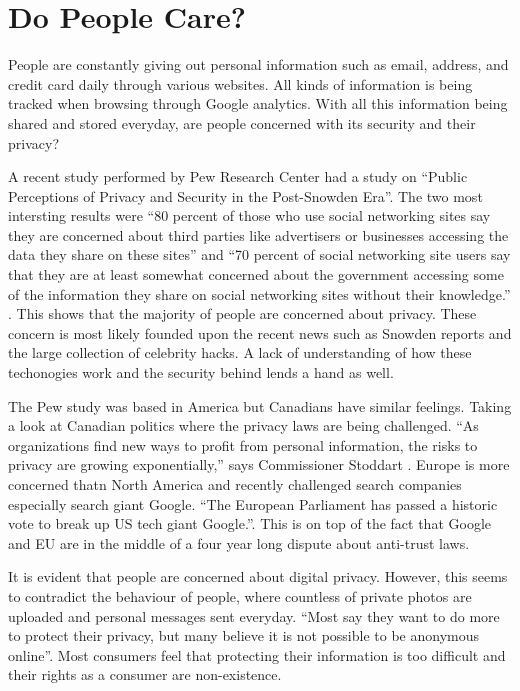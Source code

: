 \documentclass[12pt]{article}
\begin{document}
\section{Do People Care?}\label{sec:demand}

People are constantly giving out personal information such as email, address, and credit card daily through various websites. All kinds of information is being tracked when browsing through Google analytics. With all this information being shared and stored everyday, are people concerned with its security and their privacy?

A recent study performed by Pew Research Center had a study on ``Public Perceptions of Privacy and Security in the Post-Snowden Era''. The two most intersting results were ``80 percent of those who use social networking sites say they are concerned about third parties like advertisers or businesses accessing the data they share on these sites'' and ``70 percent of social networking site users say that they are at least somewhat concerned about the government accessing some of the information they share on social networking sites without their knowledge.'' \cite{Madden}. This shows that the majority of people are concerned about privacy. These concern is most likely founded upon the recent news such as Snowden reports and the large collection of celebrity hacks. A lack of understanding of how these techonogies work and the security behind lends a hand as well.

The Pew study was based in America but Canadians have similar feelings. Taking a look at Canadian politics where the privacy laws are being challenged. ``As organizations find new ways to profit from personal information, the risks to privacy are growing exponentially,'' says Commissioner Stoddart \cite{PrivacyCommissioner}. Europe is more concerned thatn North America and recently challenged search companies especially search giant Google. ``The European Parliament has passed a historic vote to break up US tech giant Google.''\cite{Cook}. This is on top of the fact that Google and EU are in the middle of a four year long dispute about anti-trust laws.

It is evident that people are concerned about digital privacy. However, this seems to contradict the behaviour of people, where countless of private photos are uploaded and personal messages sent everyday. ``Most say they want to do more to protect their privacy, but many believe it is not possible to be anonymous online''\cite{Madden}. Most consumers feel that protecting their information is too difficult and their rights as a consumer are non-existence. 
\end{document}
